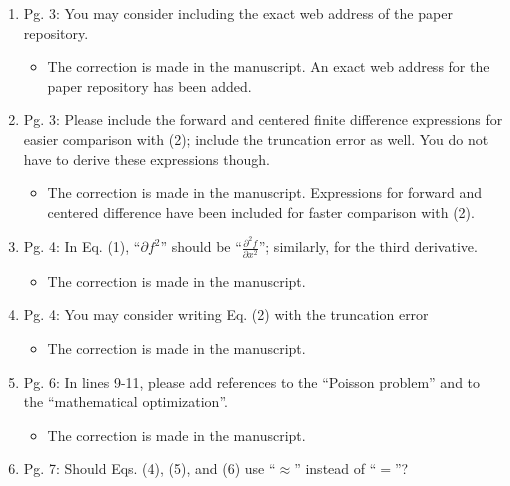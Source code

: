 \documentclass{article}
\begin{document}
\begin{enumerate}
  \item 
Pg. 3: You may consider including the exact web address of the paper repository.

{\color{red}  
\begin{itemize}
     \item
      The correction is made in the manuscript. An exact web address for the paper repository has been added.
  \end{itemize}}

  \item 
    Pg. 3: Please include the forward and centered ﬁnite difference expressions for
    easier comparison with (2); include the truncation error as well. You do not
    have to derive these expressions though.

{\color{red}  
\begin{itemize}
     \item
      The correction is made in the manuscript. Expressions for forward and centered difference have been included for faster comparison with (2).  
  \end{itemize}}

  \item 
Pg. 4: In Eq. (1), ``$\partial f^2$'' should be ``$\frac{\partial^2 f}{\partial x^2}$''; similarly, for the third derivative.

{\color{red}  
\begin{itemize}
     \item
      The correction is made in the manuscript.
  \end{itemize}}

  \item 
Pg. 4: You may consider writing Eq. (2) with the truncation error

{\color{red}  
\begin{itemize}
     \item
      The correction is made in the manuscript.
  \end{itemize}}

\item
Pg. 6: In lines 9-11, please add references to the ``Poisson problem'' and to the
``mathematical optimization''.

{\color{red}  
\begin{itemize}
     \item
      The correction is made in the manuscript.
         
  \end{itemize}}

\item
Pg. 7: Should Eqs. (4), (5), and (6) use ``$\approx$'' instead of “$=$”?


\end{enumerate}
\end{document}
